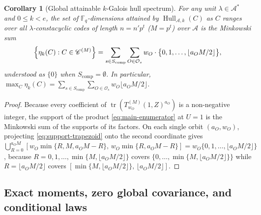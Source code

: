 \documentclass[preprint,12pt]{elsarticle}
\newcommand{\F}{\mathbb F}
\newcommand{\A}{\mathcal A}
\newcommand{\Os}{\mathcal O_s}
\newcommand{\Hull}{\operatorname{Hull}}
\newcommand{\tr}{\operatorname{tr}}
\numberwithin{equation}{section}
\theoremstyle{plain}
\newtheorem{corollary}[theorem]{Corollary}
\theoremstyle{definition}
\theoremstyle{remark}
\begin{document}
\begin{corollary}[Global attainable $k$-Galois hull spectrum]\label{cor:hull-spectrum}
For any unit $\lambda\in\A^*$ and $0\le k<e$, the set of $\F_q$-dimensions
attained by $\Hull_{\A,k}(C)$ as $C$ ranges over all $\lambda$-constacyclic codes
of length $n=n'p^t$ ($M=p^t$) over $\A$ is the Minkowski sum
\begin{equation}\label{eq:global-hull-spectrum}
\Bigl\{\eta_k(C):C\in\mathscr C^{(M)}\Bigr\}
 =\sum_{s\in S_{\mathrm{comp}}}\sum_{O\in\Os}
   w_O\cdot\bigl\{0,1,\dots,\lfloor a_O M/2\rfloor\bigr\},
\end{equation}
understood as $\{0\}$ when $S_{\mathrm{comp}}=\emptyset$. In particular,
$\max_{C}\eta_k(C)=\sum_{s\in S_{\mathrm{comp}}}\sum_{O\in\Os}
w_O\lfloor a_O M/2\rfloor$.
\end{corollary}

\begin{proof}
Because every coefficient of $\tr(T_{w_O}^{(M)}(1,Z)^{a_O})$ is a non-negative
integer, the support of the product \eqref{eq:main-enumerator} at $U=1$ is the
Minkowski sum of the supports of its factors. On each single orbit $(a_O,w_O)$,
projecting \eqref{eq:support-trapezoid} onto the second coordinate gives
$\bigcup_{R=0}^{a_O M}[w_O\min\{R,M,a_O M-R\},\,w_O\min\{R,a_O M-R\}]
=w_O\{0,1,\dots,\lfloor a_O M/2\rfloor\}$, because $R=0,1,\dots,\min\{M,\lfloor a_O M/2\rfloor\}$
covers $\{0,\dots,\min\{M,\lfloor a_O M/2\rfloor\}\}$ while $R=\lfloor a_O M/2\rfloor$
covers $[\min\{M,\lfloor a_O M/2\rfloor\},\,\lfloor a_O M/2\rfloor]$.
\end{proof}

\subsection{Exact moments, zero global covariance, and conditional laws}\label{sec:moments}
\end{document}
